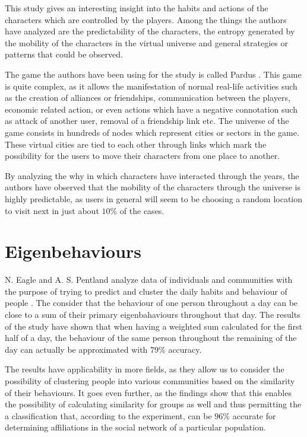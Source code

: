 This study gives an interesting insight into the habits and actions of the
characters which are controlled by the players. Among the things the authors
have analyzed are the predictability of the characters, the entropy generated by
the mobility of the characters in the virtual universe and general strategies or
patterns that could be observed.

The game the authors have been using for the study is called Pardus
\cite{Pardus}. This game is quite complex, as it allows the manifestation of
normal real-life activities such as the creation of alliances or friendships,
communication between the players, economic related action, or even actions
which have a negative connotation such as attack of another user, removal of a
friendship link etc. The universe of the game consists in hundreds of nodes
which represent cities or sectors in the game. These virtual cities are tied to
each other through links which mark the possibility for the users to move their
characters from one place to another.

By analyzing the why in which characters have interacted through the years, the
authors have observed that the mobility of the characters through the universe
is highly predictable, as users in general will seem to be choosing a random
location to visit next in just about $10\%$ of the cases.

\section{Eigenbehaviours}
N. Eagle and A. S. Pentland analyze data of individuals and communities with the
purpose of trying to predict and cluster the daily habits and behaviour of
people \cite{Eagle09}. The consider that the behaviour of one person throughout a
day can be close to a sum of their primary eigenbahaviours throughout that day.
The results of the study have shown that when having a weighted sum calculated
for the first half of a day, the behaviour of the same person throughout the
remaining of the day can actually be approximated with $79\%$ accuracy.

The results have applicability in more fields, as they allow us to consider the
possibility of clustering people into various communities based on the
similarity of their behaviours. It goes even further, as the findings show that
this enables the possibility of calculating similarity for groups as well and
thus permitting the a classification that, according to the experiment, can be
$96\%$ accurate for determining affiliations in the social network of a
particular population.

